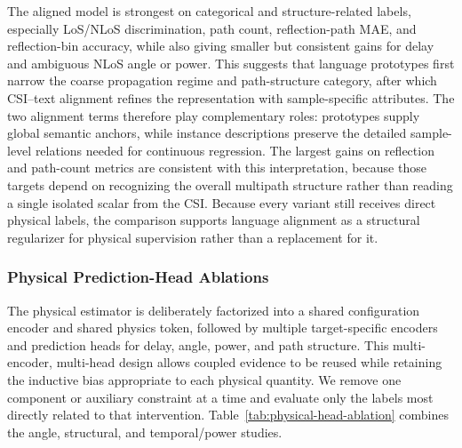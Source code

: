 The aligned model is strongest on categorical and structure-related labels, especially LoS/NLoS
discrimination, path count, reflection-path MAE, and reflection-bin accuracy, while also giving
smaller but consistent gains for delay and ambiguous NLoS angle or power. This suggests that
language prototypes first narrow the coarse propagation regime and path-structure category, after
which CSI--text alignment refines the representation with sample-specific attributes. The two
alignment terms therefore play complementary roles: prototypes supply global semantic anchors, while
instance descriptions preserve the detailed sample-level relations needed for continuous regression.
The largest gains on reflection and path-count metrics are consistent with this interpretation,
because those targets depend on recognizing the overall multipath structure rather than reading a
single isolated scalar from the CSI. Because every variant still receives direct physical labels, the
comparison supports language alignment as a structural regularizer for physical supervision rather
than a replacement for it.

\subsubsection{Physical Prediction-Head Ablations}

The physical estimator is deliberately factorized into a shared configuration encoder and shared
physics token, followed by multiple target-specific encoders and prediction heads for delay, angle,
power, and path structure. This multi-encoder, multi-head design allows coupled evidence to be reused
while retaining the inductive bias appropriate to each physical quantity. We remove one component or
auxiliary constraint at a time and evaluate only the labels most directly related to that intervention.
Table~\ref{tab:physical-head-ablation} combines the angle, structural, and temporal/power studies.

